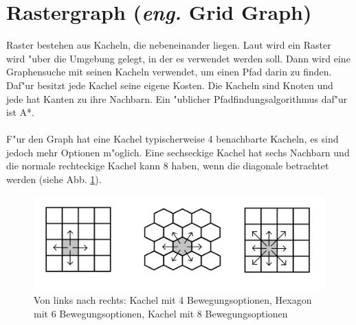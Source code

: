 \section{Rastergraph (\textit{eng.} Grid Graph)}
Raster bestehen aus Kacheln, die nebeneinander liegen. Laut \cite{Grid:02} wird ein Raster wird "uber die Umgebung gelegt, in der es verwendet werden soll. Dann wird eine Graphensuche mit seinen Kacheln verwendet, um einen Pfad darin zu finden. Daf"ur besitzt jede Kachel seine eigene Kosten. Die Kacheln sind Knoten und jede hat Kanten zu ihre Nachbarn. Ein "ublicher Pfadfindungsalgorithmus daf"ur ist A*.
\\\\
F"ur den Graph hat eine Kachel typischerweise 4 benachbarte Kacheln, es sind jedoch mehr Optionen m"oglich. Eine sechseckige Kachel hat sechs Nachbarn und die normale rechteckige Kachel kann 8 haben, wenn die diagonale betrachtet werden (siehe Abb. \ref{sec2a}).
\begin{figure} %
	\centering
	\includegraphics[width=\textwidth]{images/Grid_Tiles.png}
	\caption{Von links nach rechts: Kachel mit 4 Bewegungsoptionen, Hexagon mit 6 Bewegungsoptionen, Kachel mit 8 Bewegungsoptionen}
	\label{sec2a}
\end{figure}


